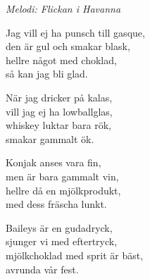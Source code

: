 {\footnotesize\textit{Melodi: Flickan i Havanna}}\par
\vspace{10pt}
Jag vill ej ha punsch till gasque,\\
den är gul och smakar blask,\\
hellre något med choklad,\\
så kan jag bli glad.\par
\vspace{10pt}
När jag dricker på kalas,\\
vill jag ej ha lowballglas,\\
whiskey luktar bara rök,\\
smakar gammalt ök.\par
\vspace{10pt}
Konjak anses vara fin,\\
men är bara gammalt vin,\\
hellre då en mjölkprodukt,\\
med dess fräscha lunkt.\par
\vspace{10pt}
Baileys är en gudadryck,\\
sjunger vi med eftertryck,\\
mjölkchoklad med sprit är bäst,\\
avrunda vår fest.
